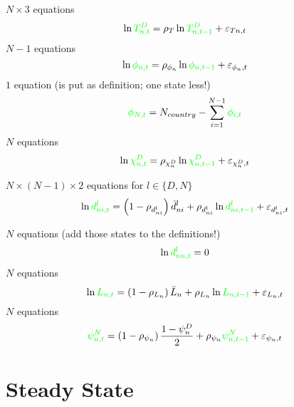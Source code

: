 \documentclass[12pt, bibtotoc, tablecaptionabove, figurecaptionabove, fleqn]{article}
\newcommand{\st}[1]{{\color{green}{#1}}}
\begin{document}
\noindent $N \times 3$ equations
\begin{equation}
\ln \st{T^D_{n,t}} = \rho_T \ln  \st{T^D_{n,t-1}} + \varepsilon_{Tn,t}    
\end{equation}
\noindent $N-1$ equations
\begin{equation}
\ln \st{\phi_{n,t}} = \rho_{\phi_n} \ln  \st{\phi_{n,t-1}} + \varepsilon_{\phi_n,t}  
\end{equation}
\noindent $1$ equation (is put as definition; one state less!)
\begin{equation}
\st{\phi_{N,t}} = N_{country} - \sum_{i=1}^{N-1} \st{\phi_{i,t}}
\end{equation}
\noindent $N$ equations
\begin{equation}
\ln \st{\chi^D_{n,t}} = \rho_{\chi^D_n} \ln  \st{\chi^D_{n,t-1}} + \varepsilon_{\chi^D_n,t}    
\end{equation}

\noindent $N \times (N-1) \times 2$ equations for $l \in \{D,N\}$
\begin{equation}
\ln \st{d^l_{ni,t}} = \left(1 - \rho_{d^l_{ni}} \right) \bar{d}^l_{ni} + \rho_{d^l_{ni}} \ln  \st{d^l_{ni,t-1}} + \varepsilon_{d^l_{ni},t}    
\end{equation}

\noindent $N$ equations (add those states to the definitions!)
\begin{equation}
\ln \st{d^l_{nn,t}} = 0  
\end{equation}
\noindent $N$ equations
\begin{equation}
\ln \st{L_{n,t}} = \left(1 - \rho_{L_{n}} \right) \bar{L}_{n} + \rho_{L_{n}} \ln  \st{L_{n,t-1}} + \varepsilon_{L_{n},t}    
\end{equation}
\noindent $N$ equations
\begin{equation}
	\st{\psi_{n,t}^N} =  \left(1 - \rho_{\psi_{n}} \right) \frac{1 - \psi^D_{n}}{2} + \rho_{\psi_{n}} \st{\psi_{n,t-1}^N} + \varepsilon_{\psi_{n},t}   
\end{equation}


\section{Steady State}
\end{document}
